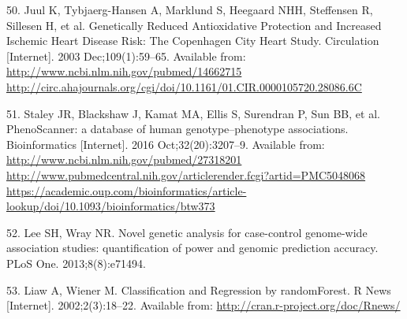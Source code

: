 \documentclass[]{article}
\begin{document}
\hypertarget{ref-Juul2003}{}
50. Juul K, Tybjaerg-Hansen A, Marklund S, Heegaard NHH, Steffensen R,
Sillesen H, et al. Genetically Reduced Antioxidative Protection and
Increased Ischemic Heart Disease Risk: The Copenhagen City Heart Study.
Circulation {[}Internet{]}. 2003 Dec;109(1):59--65. Available from:
\href{http://www.ncbi.nlm.nih.gov/pubmed/14662715\%20http://circ.ahajournals.org/cgi/doi/10.1161/01.CIR.0000105720.28086.6C}{http://www.ncbi.nlm.nih.gov/pubmed/14662715 http://circ.ahajournals.org/cgi/doi/10.1161/01.CIR.0000105720.28086.6C}

\hypertarget{ref-Staley2016}{}
51. Staley JR, Blackshaw J, Kamat MA, Ellis S, Surendran P, Sun BB, et
al. PhenoScanner: a database of human genotype--phenotype associations.
Bioinformatics {[}Internet{]}. 2016 Oct;32(20):3207--9. Available from:
\href{http://www.ncbi.nlm.nih.gov/pubmed/27318201\%20http://www.pubmedcentral.nih.gov/articlerender.fcgi?artid=PMC5048068\%20https://academic.oup.com/bioinformatics/article-lookup/doi/10.1093/bioinformatics/btw373}{http://www.ncbi.nlm.nih.gov/pubmed/27318201 http://www.pubmedcentral.nih.gov/articlerender.fcgi?artid=PMC5048068 https://academic.oup.com/bioinformatics/article-lookup/doi/10.1093/bioinformatics/btw373}

\hypertarget{ref-Lee2013c}{}
52. Lee SH, Wray NR. Novel genetic analysis for case-control genome-wide
association studies: quantification of power and genomic prediction
accuracy. PLoS One. 2013;8(8):e71494.

\hypertarget{ref-Liaw2002}{}
53. Liaw A, Wiener M. Classification and Regression by randomForest. R
News {[}Internet{]}. 2002;2(3):18--22. Available from:
\url{http://cran.r-project.org/doc/Rnews/}
\end{document}
